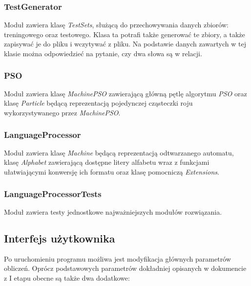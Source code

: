 \documentclass{../llncs_template_final/llncs}
\begin{document}
\subsubsection*{TestGenerator}
Moduł zawiera klasę \emph{TestSets}, służącą do przechowywania danych zbiorów: treningowego oraz testowego. Klasa ta potrafi także generować te zbiory, a także zapisywać je do pliku i wczytywać z pliku. Na podstawie danych zawartych w tej klasie można odpowiedzieć na pytanie, czy dwa słowa są w relacji.

\subsubsection*{PSO}
Moduł zawiera klasę \emph{MachinePSO} zawierającą główną pętlę algorytmu \emph{PSO} oraz klasę \emph{Particle} będącą reprezentacją pojedynczej cząsteczki roju wykorzystywanego przez \emph{MachinePSO}.

\subsubsection*{LanguageProcessor}
Moduł zawiera klasę \emph{Machine} będącą reprezentacją odtwarzanego automatu, klasę \emph{Alphabet} zawierającą dostępne litery alfabetu wraz z funkcjami ułatwiającymi konwersję ich formatu oraz klasę pomocniczą \emph{Extensions}.

\subsubsection*{LanguageProcessorTests}
Moduł zawiera testy jednostkowe najważniejszych modułów rozwiązania.

\newpage

\subsection{Interfejs użytkownika}
Po uruchomieniu programu możliwa jest modyfikacja głównych parametrów obliczeń. Oprócz podstawowych parametrów dokładniej opisanych w dokumencie z I etapu obecne są także dwa dodatkowe:
\end{document}
